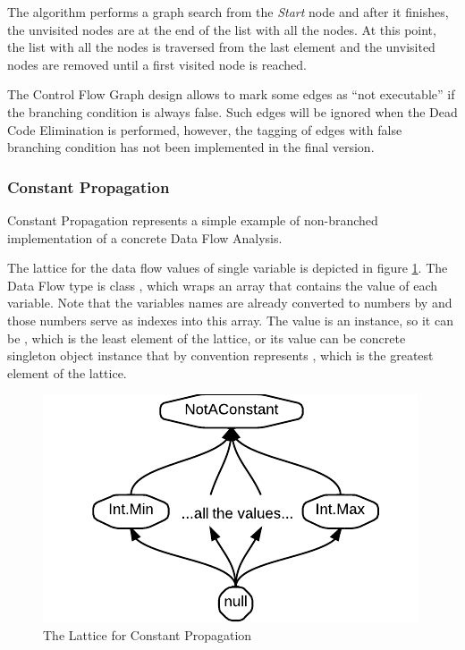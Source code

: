         The algorithm performs a graph search from the \emph{Start} 
        node and after it finishes, the unvisited nodes are 
        at the end of the list with all the nodes. At this point, 
        the list with all the nodes is traversed from the last 
        element and the unvisited nodes are removed until a 
        first visited node is reached.
        
        The Control Flow Graph design allows to mark 
        some edges as ``not executable'' if the branching 
        condition is always false. Such edges will be ignored 
        when the Dead Code Elimination is performed, however, 
        the tagging of edges with false branching condition 
        has not been implemented in the final version.
        
        \subsubsection*{Constant Propagation}
        Constant Propagation represents a simple example of non-branched 
        implementation of a concrete Data Flow Analysis. 
        
        The lattice for the data flow values of single variable is 
        depicted in figure \ref{constlattice}. The Data Flow type is class 
        , which wraps an array 
        that contains the value of each variable. Note 
        that the variables names are already converted to numbers by 
         and those numbers serve as indexes into this array.
        The value is an  instance, so it can be , which 
        is the least element of the lattice, or its value can be concrete 
        singleton object instance that by convention represents 
        , which is the greatest element of the lattice.
        
\begin{figure}[h]  
  \centering
    \includegraphics{img/ConstLattice.pdf}  
    \caption{The Lattice for Constant Propagation\label{constlattice}}
\end{figure}        
        
